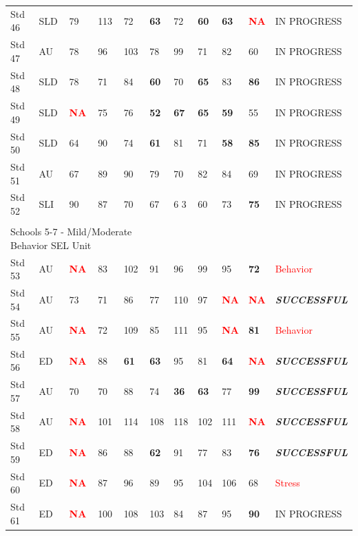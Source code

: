 \documentclass[twoside]{article}
\begin{document}
\begin{tiny}
\begin{landscape}
\begin{longtable}{p{1.5cm}p{1.5cm}p{1.5cm}p{1.5cm}p{1.75cm}p{1.75cm}p{1.75cm}p{1.75cm}p{1.75cm}p{1.75cm}p{2.5cm}@{}}
Std 46 & SLD & 79 & 113 & 72 & \textbf{63} & 72 & \textbf{60} & \textbf{63} & \textcolor{red}{\textbf{NA}} & IN PROGRESS\\ 
Std 47 & AU & 78 & 96 & 103 & 78 & 99 & 71 & 82 & 60 &  IN PROGRESS \\
Std 48 & SLD & 78 & 71 & 84 & \textbf{60} & 70 & \textbf{65} & 83 & \textbf{86} &  IN PROGRESS\\
Std 49 & SLD & \textcolor{red}{\textbf{NA}} & 75 & 76 & \textbf{52} & \textbf{67} & \textbf{65} & \textbf{59} & 55 &  IN PROGRESS\\
Std 50 & SLD & 64 & 90 & 74 & \textbf{61} & 81 & 71 & \textbf{58} & \textbf{85} &  IN PROGRESS\\
Std 51 & AU & 67 & 89 & 90 & 79 & 70 & 82 & 84 & 69 &  IN PROGRESS\\
Std 52 & SLI & 90 & 87 & 70 & 67 & 6 3& 60 & 73 & \textbf{75} &  IN PROGRESS \\
\hline\\
%
\multicolumn {5}{l}{Schools 5-7 - Mild/Moderate Behavior SEL Unit} & & & & & &\\
\cmidrule(lr){1-2}
Std 53 & AU & \textcolor{red}{\textbf{NA}} & 83 & 102 & 91 & 96 & 99 & 95 & \textbf{72} & \textcolor{red}{Behavior}\\
Std 54 & AU & 73 & 71 & 86 & 77 & 110 & 97 & \textcolor{red}{\textbf{NA}} & \textcolor{red}{\textbf{NA}} & \textbf{\textit{SUCCESSFUL}} \\
Std 55 & AU & \textcolor{red}{\textbf{NA}} & 72 & 109 & 85 & 111 & 95 & \textcolor{red}{\textbf{NA}} & \textbf{81} & \textcolor{red}{Behavior} \\
Std 56 & ED & \textcolor{red}{\textbf{NA}} & 88 & \textbf{61} & \textbf{63} & 95 & 81 & \textbf{64} & \textcolor{red}{\textbf{NA}} & \textbf{\textit{SUCCESSFUL}} \\
Std 57 & AU & 70 & 70 & 88 & 74 & \textbf{36} & \textbf{63} & 77 & \textbf{99} & \textbf{\textit{SUCCESSFUL}} \\
Std 58 & AU & \textcolor{red}{\textbf{NA}} & 101 & 114 & 108 & 118 & 102 & 111 & \textcolor{red}{\textbf{NA}} & \textbf{\textit{SUCCESSFUL}}\\
Std 59 & ED & \textcolor{red}{\textbf{NA}} & 86 & 88 & \textbf{62} & 91 & 77 & 83 & \textbf{76} & \textbf{\textit{SUCCESSFUL}} \\
Std 60 & ED & \textcolor{red}{\textbf{NA}} & 87 & 96 & 89 & 95 & 104 & 106 & 68 & \textcolor{red}{Stress} \\
Std 61 & ED & \textcolor{red}{\textbf{NA}} & 100 & 108 & 103 & 84 & 87 & 95 & \textbf{90} & IN PROGRESS \\

\end{longtable}
\end{landscape}
\end{tiny}
\end{document}
